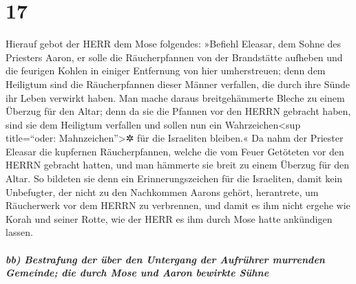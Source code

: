\hypertarget{section-16}{%
\section{17}\label{section-16}}

Hierauf gebot der HERR dem Mose folgendes:
»Befiehl Eleasar, dem Sohne des Priesters Aaron, er solle
die Räucherpfannen von der Brandstätte aufheben und die feurigen Kohlen
in einiger Entfernung von hier umherstreuen; denn dem
Heiligtum sind die Räucherpfannen dieser Männer verfallen, die durch
ihre Sünde ihr Leben verwirkt haben. Man mache daraus breitgehämmerte
Bleche zu einem Überzug für den Altar; denn da sie die Pfannen vor den
HERRN gebracht haben, sind sie dem Heiligtum verfallen und sollen nun
ein Wahrzeichen\textless sup title=``oder: Mahnzeichen''\textgreater✲
für die Israeliten bleiben.« Da nahm der Priester Eleasar
die kupfernen Räucherpfannen, welche die vom Feuer Getöteten vor den
HERRN gebracht hatten, und man hämmerte sie breit zu einem Überzug für
den Altar. So bildeten sie denn ein Erinnerungszeichen für
die Israeliten, damit kein Unbefugter, der nicht zu den Nachkommen
Aarons gehört, herantrete, um Räucherwerk vor dem HERRN zu verbrennen,
und damit es ihm nicht ergehe wie Korah und seiner Rotte, wie der HERR
es ihm durch Mose hatte ankündigen lassen.

\hypertarget{bb-bestrafung-der-uxfcber-den-untergang-der-aufruxfchrer-murrenden-gemeinde-die-durch-mose-und-aaron-bewirkte-suxfchne}{%
\subparagraph{bb) Bestrafung der über den Untergang der Aufrührer
murrenden Gemeinde; die durch Mose und Aaron bewirkte
Sühne}\label{bb-bestrafung-der-uxfcber-den-untergang-der-aufruxfchrer-murrenden-gemeinde-die-durch-mose-und-aaron-bewirkte-suxfchne}}

